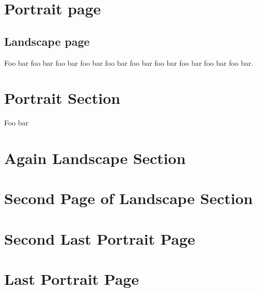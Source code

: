\documentclass{article}
\begin{document}
\section{Portrait page}
\begin{landscape}
\section{Landscape page}
Foo bar foo bar foo bar foo bar foo bar
foo bar foo bar foo bar foo bar foo bar.
\end{landscape}
\section{Portrait Section}
Foo bar
\begin{landscape}
\section{Again Landscape Section}
\newpage
\section{Second Page of Landscape Section}
\end{landscape}
\section{Second Last Portrait Page}
\newpage
\section{Last Portrait Page}
\end{document}
